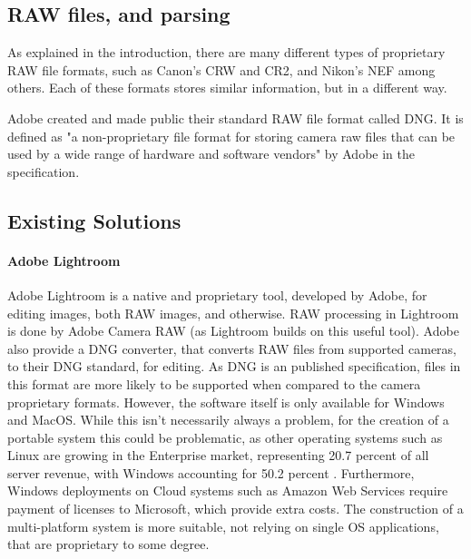 \documentclass[11pt,a4paper]{article}
\begin{document}
\subsection{RAW files, and parsing}
% 


As explained in the introduction, there are many different types of proprietary RAW file formats, such as Canon's CRW and CR2, and Nikon's NEF among others.
Each of these formats stores similar information, but in a different way.

Adobe created and made public their standard RAW file format called DNG. It is defined as "a non-proprietary file format for storing camera raw files that
can be used by a wide range of hardware and software vendors" by Adobe in the specification. \cite{DNGSpec}


\subsection{Existing Solutions}

    \paragraph{Adobe Lightroom}
    Adobe Lightroom is a native and proprietary tool, developed by Adobe, for editing images, both RAW images, and otherwise.
    RAW processing in Lightroom is done by Adobe Camera RAW (as Lightroom builds on this useful tool). \cite{AdobeCameraRAW}
    Adobe also provide a DNG converter, that converts RAW files from supported cameras, to their DNG standard,
    for editing. As DNG is an published specification, files in this format are more likely to be supported
    when compared to the camera proprietary formats. However, the software itself is only available for Windows
    and MacOS.\cite{AdobeDNGConverter} While this isn't necessarily always a problem, for the creation of a portable system this could be problematic,
    as other operating systems such as Linux are growing in the Enterprise market, representing 20.7 percent of all server revenue, with Windows
    accounting for 50.2 percent \cite{LinuxServerGrowth}. Furthermore, Windows deployments on Cloud systems such as Amazon Web Services require
    payment of licenses to Microsoft, which provide extra costs. The construction of a multi-platform system is more suitable, not relying on
    single OS applications, that are proprietary to some degree.
\end{document}
